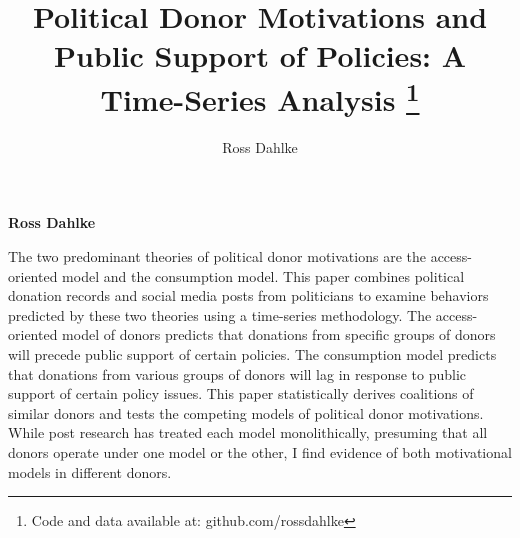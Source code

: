 \documentclass[12pt,]{article}
\title{Political Donor Motivations and Public Support of Policies: A
Time-Series Analysis \thanks{Code and data available at: github.com/rossdahlke}  }
\author{\Large Ross Dahlke\vspace{0.05in} \newline\normalsize\emph{}  }
\date{}
\newcommand*{\authorfont}{\fontfamily{phv}\selectfont}
\renewenvironment{abstract}
 {{%
    \setlength{\leftmargin}{0mm}
    \setlength{\rightmargin}{\leftmargin}%
  }%
  \relax}
 {\endlist}
\begin{document}
	
%

{%
\setlength{\parindent}{0pt}
\thispagestyle{plain}
{\fontsize{18}{20}\selectfont\raggedright 
\maketitle  %

}

{
   \vskip 13.5pt\relax \normalsize\fontsize{11}{12} 
\textbf{\authorfont Ross Dahlke} \hskip 15pt \emph{\small }   

}

}








\begin{abstract}

    \hbox{\vrule height .2pt width 39.14pc}

    \vskip 8.5pt %

\noindent The two predominant theories of political donor motivations are the
access-oriented model and the consumption model. This paper combines
political donation records and social media posts from politicians to
examine behaviors predicted by these two theories using a time-series
methodology. The access-oriented model of donors predicts that donations
from specific groups of donors will precede public support of certain
policies. The consumption model predicts that donations from various
groups of donors will lag in response to public support of certain
policy issues. This paper statistically derives coalitions of similar
donors and tests the competing models of political donor motivations.
While post research has treated each model monolithically, presuming
that all donors operate under one model or the other, I find evidence of
both motivational models in different donors.


    \hbox{\vrule height .2pt width 39.14pc}


\end{abstract}


\vskip -8.5pt



\noindent \doublespacing 
\end{document}

